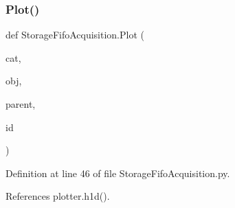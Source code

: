 \subsubsection{\texorpdfstring{Plot()}{Plot()}}
{\footnotesize\ttfamily def Storage\+Fifo\+Acquisition.\+Plot (\begin{DoxyParamCaption}\item[{}]{cat,  }\item[{}]{obj,  }\item[{}]{parent,  }\item[{}]{id }\end{DoxyParamCaption})}



Definition at line 46 of file Storage\+Fifo\+Acquisition.\+py.



References plotter.\+h1d().


